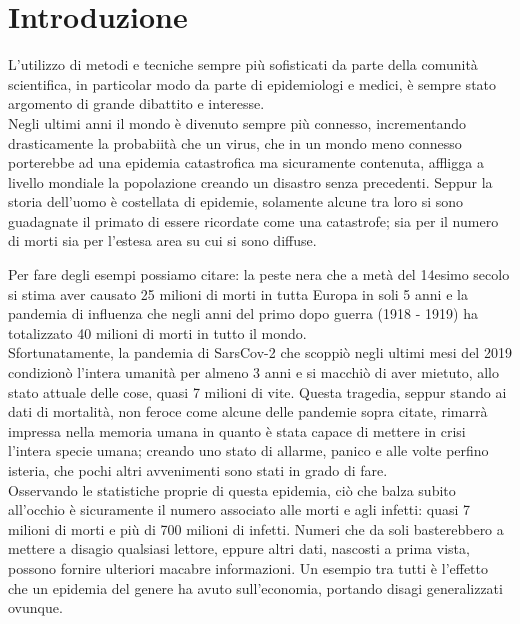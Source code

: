 \section{Introduzione}

L’utilizzo di metodi e tecniche sempre più sofisticati 
da parte della comunità scientifica, in particolar modo da parte di epidemiologi e medici, 
è sempre stato argomento di grande dibattito e interesse. 
\\

Negli ultimi anni il mondo è divenuto sempre più connesso, 
incrementando drasticamente la probabiità che un virus, 
che in un mondo meno connesso porterebbe ad una epidemia catastrofica ma sicuramente contenuta, 
affligga a livello mondiale la popolazione creando un disastro senza precedenti. 
Seppur la storia dell’uomo è costellata di epidemie, 
solamente alcune tra loro si sono guadagnate il primato di essere ricordate come una catastrofe; 
sia per il numero di morti sia per l’estesa area su cui si sono diffuse. 

Per fare degli esempi possiamo citare: la peste nera che a metà del 14esimo secolo 
si stima aver causato 25 milioni di morti in tutta Europa in soli 5 anni e la pandemia 
di influenza che negli anni del primo dopo guerra (1918 - 1919) ha totalizzato 40 milioni 
di morti in tutto il mondo. 
\\

Sfortunatamente, la pandemia di SarsCov-2 che scoppiò negli ultimi mesi del 2019 condizionò 
l’intera umanità per almeno 3 anni e si macchiò di aver mietuto, allo stato attuale delle cose, 
quasi 7 milioni di vite. Questa tragedia, seppur stando ai dati di mortalità, 
non feroce come alcune delle pandemie sopra citate, 
rimarrà impressa nella memoria umana in quanto è stata capace di mettere in crisi l’intera specie umana; 
creando uno stato di allarme, panico e alle volte perfino isteria, 
che pochi altri avvenimenti sono stati in grado di fare. 
\\

Osservando le statistiche proprie di questa epidemia, 
ciò che balza subito all’occhio è sicuramente il numero associato alle morti e agli infetti: 
quasi 7 milioni di morti e più di 700 milioni di infetti. 
Numeri che da soli basterebbero a mettere a disagio qualsiasi lettore, 
eppure altri dati, nascosti a prima vista, possono fornire ulteriori macabre informazioni. 
Un esempio tra tutti è l’effetto che un epidemia del genere ha avuto sull’economia, 
portando disagi generalizzati ovunque. 

